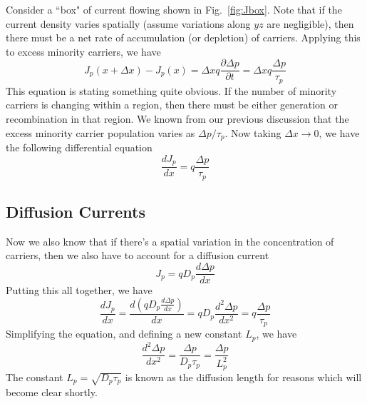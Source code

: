 Consider a ``box" of current flowing shown in Fig.~\ref{fig:Jbox}.  Note that if the current density varies spatially (assume variations along $yz$ are negligible), then there must be a net rate of accumulation (or depletion) of carriers.  Applying this to excess minority carriers, we have
\begin{equation}
	J_p(x + \Delta x) - J_p(x) =  \Delta x q \frac{\partial \Delta p}{\partial t} =  \Delta x q \frac{\Delta p}{\tau_p}
\end{equation}
This equation is stating something quite obvious.  If the number of minority carriers is changing within a region, then there must be either generation or recombination in that region.  We known from our previous discussion that the excess minority carrier population varies as $\Delta p/\tau_p$.
%
Now taking $\Delta x \rightarrow 0$, we have the following differential equation
\begin{equation}
	\frac{dJ_p}{dx}  = q \frac{\Delta p}{\tau_p}
\end{equation}
\subsection{Diffusion Currents}
Now we also know that if there's a spatial variation in the concentration of carriers, then we also have to account for a diffusion current
\begin{equation}
	J_p = q D_p \frac{d\Delta p}{dx}
\end{equation}
Putting this all together, we have 
\begin{equation}
	\frac{dJ_p}{dx}  = \frac{d(q D_p \frac{d\Delta p}{dx})}{dx} = q D_p \frac{d^2 \Delta  p}{dx^2} = q \frac{\Delta p}{\tau_p}
\end{equation}
Simplifying the equation, and defining a new constant $L_p$, we have
\begin{equation}
	 \frac{d^2 \Delta p}{dx^2} =  \frac{\Delta p}{D_p \tau_p} =  \frac{\Delta p}{L_p^2}
	 \label{eq:continuity}
\end{equation}
The constant $L_p = \sqrt{D_p \tau_p}$ is known as the diffusion length for reasons which will become clear shortly.
